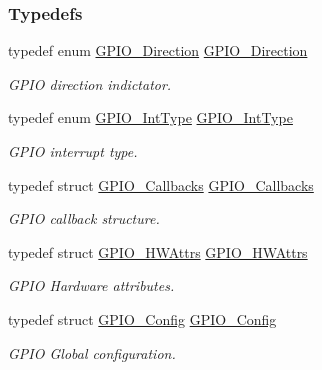 \subsubsection*{Typedefs}
\begin{DoxyCompactItemize}
\item 
typedef enum \hyperlink{_g_p_i_o_8h_a0c1bff6c02d7155b78f07abd8c31722f}{G\-P\-I\-O\-\_\-\-Direction} \hyperlink{_g_p_i_o_8h_aa0ecedf7ce14ed787c307c4da0715223}{G\-P\-I\-O\-\_\-\-Direction}
\begin{DoxyCompactList}\small\item\em G\-P\-I\-O direction indictator. \end{DoxyCompactList}\item 
typedef enum \hyperlink{_g_p_i_o_8h_abf424f4c82447febc105783bb24d66b0}{G\-P\-I\-O\-\_\-\-Int\-Type} \hyperlink{_g_p_i_o_8h_a4aacf71cd31c688c4a6d449989c7cbc6}{G\-P\-I\-O\-\_\-\-Int\-Type}
\begin{DoxyCompactList}\small\item\em G\-P\-I\-O interrupt type. \end{DoxyCompactList}\item 
typedef struct \hyperlink{struct_g_p_i_o___callbacks}{G\-P\-I\-O\-\_\-\-Callbacks} \hyperlink{_g_p_i_o_8h_aef0e65e0a1d0f0451cafdf0e6db272bf}{G\-P\-I\-O\-\_\-\-Callbacks}
\begin{DoxyCompactList}\small\item\em G\-P\-I\-O callback structure. \end{DoxyCompactList}\item 
typedef struct \hyperlink{struct_g_p_i_o___h_w_attrs}{G\-P\-I\-O\-\_\-\-H\-W\-Attrs} \hyperlink{_g_p_i_o_8h_ae4ec83381a72983648e99e3e60552781}{G\-P\-I\-O\-\_\-\-H\-W\-Attrs}
\begin{DoxyCompactList}\small\item\em G\-P\-I\-O Hardware attributes. \end{DoxyCompactList}\item 
typedef struct \hyperlink{struct_g_p_i_o___config}{G\-P\-I\-O\-\_\-\-Config} \hyperlink{_g_p_i_o_8h_a2c53b92a39d3be9df0c416318a360482}{G\-P\-I\-O\-\_\-\-Config}
\begin{DoxyCompactList}\small\item\em G\-P\-I\-O Global configuration. \end{DoxyCompactList}\end{DoxyCompactItemize}

